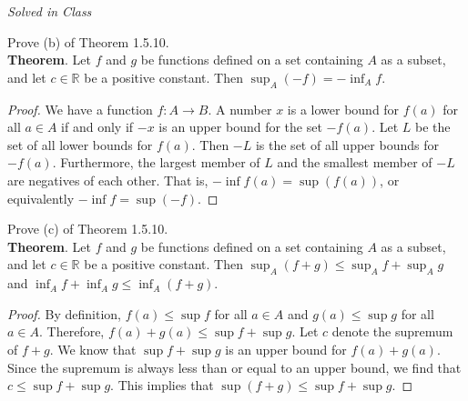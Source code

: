 \documentclass[12pt]{book}
\newenvironment{exercise}[2][Exercise]{\begin{trivlist}
\item[\hskip \labelsep {\bfseries #1}\hskip \labelsep {\bfseries #2.}]}{\end{trivlist}}
\begin{document}
\begin{exercise}{1.5.9}
\emph{Solved in Class}
\end{exercise}

\begin{exercise}{1.5.11}
Prove (b) of Theorem 1.5.10. \\

\textbf{Theorem}. Let $f$ and $g$ be functions defined on a set containing $A$ as a subset, and let $c \in \mathbb{R}$ be a positive constant. Then $\sup_A (-f) = - \inf_A f$.

	\begin{proof}
	We have a function $f: A \to B$. A number $x$ is a lower bound for $f(a)$ for all $a \in A$ if and only if $-x$ is an upper bound for the set $-f(a)$. Let  $L$ be the set of all lower bounds for $f(a)$. Then $-L$ is the set of all upper bounds for $-f(a)$. Furthermore, the largest member of $L$ and the smallest member of $-L$ are negatives of each other. That is, $- \inf f(a) = \sup (f(a))$, or equivalently $- \inf f = \sup (-f)$.
	\end{proof}
\end{exercise}

\begin{exercise}{1.5.12}
Prove (c) of Theorem 1.5.10.\\

\textbf{Theorem}. Let $f$ and $g$ be functions defined on a set containing $A$ as a subset, and let $c \in \mathbb{R}$ be a positive constant. Then $\sup_A (f+g) \leq \sup_A f + \sup_A g $ and $\inf_A f + \inf_A g \leq \inf_A (f+g)$.

	\begin{proof}
	By definition, $f(a) \leq \sup f$ for all $a \in A$ and $g(a) \leq \sup g$ for all $a \in A$. Therefore, $f(a)+g(a) \leq \sup f + \sup g$. Let $c$ denote the supremum of $f+g$. We know that $\sup f + \sup g$ is an upper bound  for $f(a)+g(a)$. Since the supremum is always less than or equal to an upper bound, we find that $c \leq \sup f + \sup g$. This implies that $\sup (f+g) \leq \sup f + \sup g$.
	\end{proof}
\end{exercise}
\end{document}
